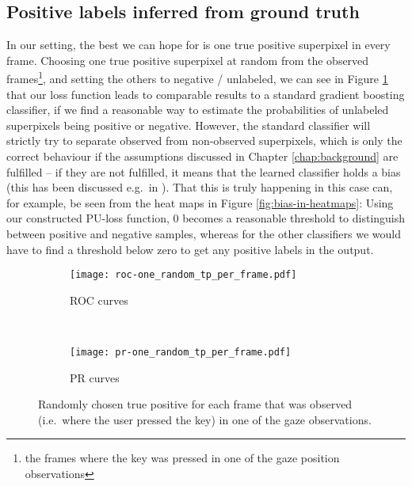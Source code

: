 \subsection{Positive labels inferred from ground truth}
In our setting, the best we can hope for is one true positive superpixel in every frame. Choosing one true positive superpixel at random from the observed frames\footnote{the frames where the key was pressed in one of the gaze position observations}, and setting the others to negative / unlabeled, we can see in Figure \ref{fig:one-random-tp-per-frame} that our loss function leads to comparable results to a standard gradient boosting classifier, if we find a reasonable way to estimate the probabilities  of unlabeled superpixels being positive or negative. 
However, the standard classifier will strictly try to separate observed from non-observed superpixels, which is only the correct behaviour if the assumptions discussed in Chapter \ref{chap:background} are fulfilled -- if they are not fulfilled, it means that the learned classifier holds a bias (this has been discussed e.g.\ in ). 
That this is truly happening in this case can, for example, be seen from the heat maps in Figure \ref{fig:bias-in-heatmaps}: Using our constructed PU-loss function, 0 becomes a reasonable threshold to distinguish between positive and negative samples, whereas for the other classifiers we would have to find a threshold below zero to get any positive labels in the output.

\begin{figure}[ht]
	\centering
	\begin{subfigure}[h]{0.45\textwidth}
	\texttt{[image: roc-one\_random\_tp\_per\_frame.pdf]}	
		\caption*{ROC curves}
	\end{subfigure}
	~
	\begin{subfigure}[h]{0.45\textwidth}
	\texttt{[image: pr-one\_random\_tp\_per\_frame.pdf]}	
		\caption*{PR curves}
	\end{subfigure}
	\caption{Randomly chosen true positive for each frame that was observed (i.e.\ where the user pressed the key) in one of the gaze observations.}
	\label{fig:one-random-tp-per-frame}
\end{figure}


